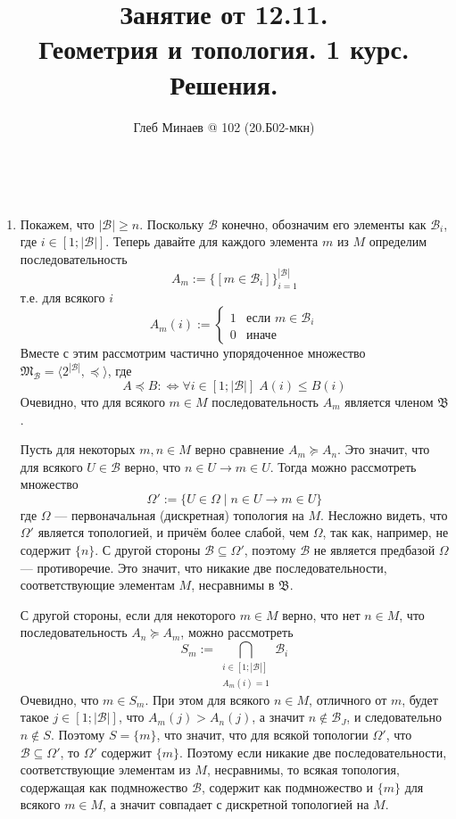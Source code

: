 \documentclass[12pt,a4paper]{article}
\title{Занятие от 12.11.\\Геометрия и топология. 1 курс.\\Решения.}
\author{Глеб Минаев @ 102 (20.Б02-мкн)}
\begin{document}
    \maketitle

    \begin{problem}{14}\ 
        \begin{enumerate}
            \item Покажем, что $|\mathcal{B}| \geqslant n$. Поскольку $\mathcal{B}$ конечно, обозначим его элементы как $\mathcal{B}_i$, где $i \in [1; |\mathcal{B}|]$. Теперь давайте для каждого элемента $m$ из $M$ определим последовательность
                \[A_m := \{[m \in \mathcal{B}_i]\}_{i=1}^{|\mathcal{B}|}\]
                т.е. для всякого $i$
                \[
                    A_m(i) :=
                    \begin{cases}
                        1& \text{если $m \in \mathcal{B}_i$}\\
                        0& \text{иначе}
                    \end{cases}
                \]
                Вместе с этим рассмотрим частично упорядоченное множество $\mathfrak{M}_\mathcal{B} = \langle 2^{|\mathcal{B}|}, \preccurlyeq \rangle$, где
                \[
                    A \preccurlyeq B :\Longleftrightarrow \forall i \in [1; |\mathcal{B}|]\; A(i) \leqslant B(i) 
                \]
                Очевидно, что для всякого $m \in M$ последовательность $A_m$ является членом $\mathfrak{B}$.

                Пусть для некоторых $m, n \in M$ верно сравнение $A_m \succcurlyeq A_n$. Это значит, что для всякого $U \in \mathcal{B}$ верно, что $n \in U \rightarrow m \in U$. Тогда можно рассмотреть множество
                \[\Omega' := \{U \in \Omega \mid n \in U \rightarrow m \in U\}\]
                где $\Omega$ --- первоначальная (дискретная) топология на $M$. Несложно видеть, что $\Omega'$ является топологией, и причём более слабой, чем $\Omega$, так как, например, не содержит $\{n\}$. С другой стороны $\mathcal{B} \subseteq \Omega'$, поэтому $\mathcal{B}$ не является предбазой $\Omega$ --- противоречие. Это значит, что никакие две последовательности, соответствующие элементам $M$, несравнимы в $\mathfrak{B}$.

                С другой стороны, если для некоторого $m \in M$ верно, что нет $n \in M$, что последовательность $A_n \succcurlyeq A_m$, можно рассмотреть
                \[S_m := \bigcap_{\substack{i \in [1; |\mathcal{B}|]\\A_m(i) = 1}} \mathcal{B}_i\]
                Очевидно, что $m \in S_m$. При этом для всякого $n \in M$, отличного от $m$, будет такое $j \in [1; |\mathcal{B}|]$, что $A_m(j) > A_n(j)$, а значит $n \notin \mathcal{B}_J$, и следовательно $n \notin S$. Поэтому $S = \{m\}$, что значит, что для всякой топологии $\Omega'$, что $\mathcal{B} \subseteq \Omega'$, то $\Omega'$ содержит $\{m\}$. Поэтому если никакие две последовательности, соответствующие элементам из $M$, несравнимы, то всякая топология, содержащая как подмножество $\mathcal{B}$, содержит как подмножество и $\{m\}$ для всякого $m \in M$, а значит совпадает с дискретной топологией на $M$.


\end{enumerate}
\end{problem}
\end{document}
